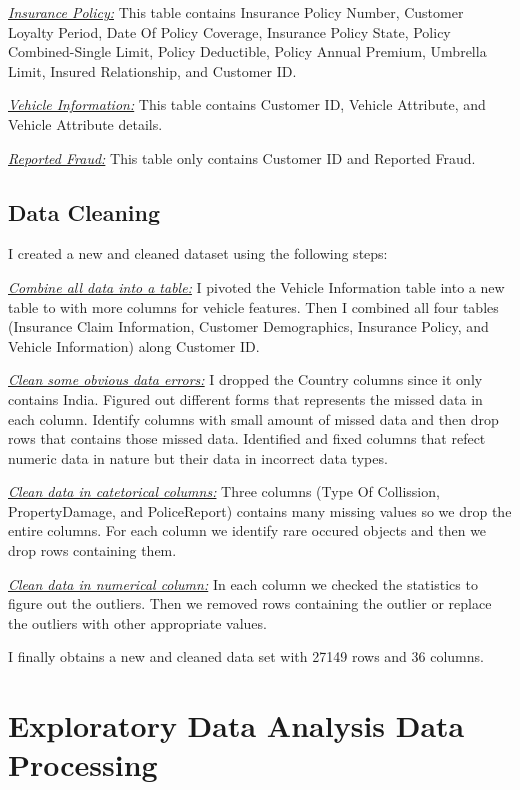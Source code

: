 \documentclass[oneside,12pt,reqno]{amsart}
\theoremstyle{definition}
\begin{document}
\underline{\textit{Insurance Policy:}} This table contains Insurance Policy Number, Customer Loyalty Period, Date Of Policy Coverage, Insurance Policy State, Policy Combined-Single Limit, Policy Deductible, Policy Annual Premium, Umbrella Limit, Insured Relationship, and Customer ID. 

\underline{\textit{Vehicle Information:}} This table contains Customer ID, Vehicle Attribute, and Vehicle Attribute details.

\underline{\textit{Reported Fraud:}} This table only contains Customer ID and Reported Fraud.
\subsection{Data Cleaning}       
I created a new and cleaned dataset using the following steps:

\underline{\textit{Combine all data into a table:}} I pivoted the Vehicle Information table into a new table to with more columns for vehicle features. Then I combined all four tables (Insurance Claim Information, Customer Demographics, Insurance Policy, and Vehicle Information) along Customer ID.


\underline{\textit{Clean some obvious data errors:}} I dropped the Country columns since it only contains India. Figured out different forms that represents the missed data in each column. Identify columns with small amount of missed data and then drop rows that contains those missed data. Identified and fixed columns that refect numeric data in nature but their data in incorrect data types. 

\underline{\textit{Clean data in catetorical columns:}} Three columns (Type Of Collission, PropertyDamage, and PoliceReport) contains many missing values so we drop the entire columns. For each column we identify rare occured objects and then we drop rows containing them.

\underline{\textit{Clean data in numerical column:}} In each column we checked the statistics to figure out the outliers. Then we removed rows containing the outlier or replace the outliers with other appropriate values. 

I finally obtains a new and cleaned data set with 27149 rows and 36 columns.



\section{Exploratory Data Analysis Data Processing}
\end{document}
